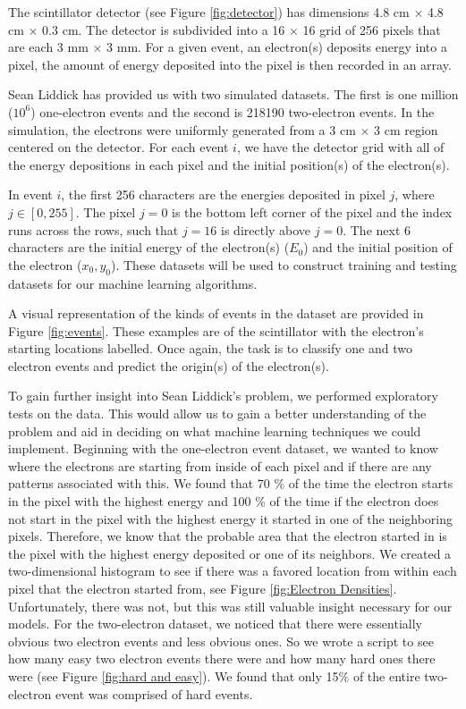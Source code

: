 \documentclass[12pt]{article}
\begin{document}
The scintillator detector (see Figure \ref{fig:detector}) has dimensions  4.8 cm $\times$ 4.8 cm $\times$ 0.3 cm. The detector is subdivided into a 16 $\times $ 16 grid of 256 pixels that are each 3 mm $\times$ 3 mm. For a given event, an electron(s) deposits energy into a pixel, the amount of energy deposited into the pixel is then recorded in an array.

Sean Liddick has provided us with two simulated datasets. The first is one million ($10^{6}$) one-electron events and the second is 218190 two-electron events. In the simulation, the electrons were uniformly generated from a 3 cm $\times$ 3 cm region centered on the detector. For each event $i$, we have the detector grid with all of the energy depositions in each pixel and the initial position(s) of the electron(s). 

In event $i$, the first 256 characters are the energies deposited in pixel $j$, where $j \in [0,255]$. The pixel $j =0$ is the bottom left corner of the pixel and the index runs across the rows, such that $j=16$ is directly above $j=0$. The next 6 characters are the initial energy of the electron(s) ($E_{0}$) and the initial position of the electron ($x_{0}, y_{0}$). These datasets will be used to construct training and testing datasets for our machine learning algorithms. 

A visual representation of the kinds of events in the dataset are provided in Figure \ref{fig:events}. These examples are of the scintillator with the electron's starting locations labelled. Once again, the task is to classify one and two electron events and predict the origin(s) of the electron(s). 

To gain further insight into Sean Liddick's problem, we performed exploratory tests on the data. This would allow us to gain a better understanding of the problem and aid in deciding on what machine learning techniques we could implement. Beginning with the one-electron event dataset, we wanted to know where the electrons are starting from inside of each pixel and if there are any patterns associated with this. We found that 70 \% of the time the electron starts in the pixel with the highest energy and 100 \% of the time if the electron does not start in the pixel with the highest energy it started in one of the neighboring pixels. Therefore, we know that the probable area that the electron started in is the pixel with the highest energy deposited or one of its neighbors. We created a two-dimensional histogram to see if there was a favored location from within each pixel that the electron started from, see Figure \ref{fig:Electron Densities}. Unfortunately, there was not, but this was still valuable insight necessary for our models. For the two-electron dataset, we noticed that there were essentially obvious two electron events and less obvious ones. So we wrote a script to see how many easy two electron events there were and how many hard ones there were (see Figure \ref{fig:hard and easy}). We found that only 15\% of the entire two-electron event was comprised of hard events.
\end{document}
